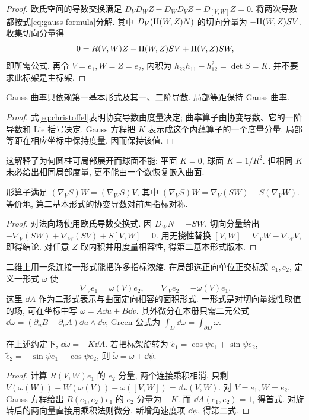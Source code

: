 \begin{proof}
欧氏空间的导数交换满足 $D_VD_WZ-D_WD_VZ-D_{[V,W]}Z=0$. 将两次导数都按式\eqref{eq:gauss-formula}分解. 其中 $D_V(\mathrm{II}(W,Z)N)$ 的切向分量为 $-\mathrm{II}(W,Z)SV$. 收集切向分量得
\[
 0=R(V,W)Z-\mathrm{II}(W,Z)SV+\mathrm{II}(V,Z)SW,
\]
即所需公式. 再令 $V=e_1,W=Z=e_2$, 内积为 $h_{22}h_{11}-h_{12}^2=\det S=K$. 并不要求此标架是主标架.
\end{proof}
\begin{corollary}\label{cor:egregium}
Gauss 曲率只依赖第一基本形式及其一、二阶导数. 局部等距保持 Gauss 曲率.
\end{corollary}
\begin{proof}
式\eqref{eq:christoffel}表明协变导数由度量决定; 曲率算子由协变导数、它的一阶导数和 Lie 括号决定. Gauss 方程把 $K$ 表示成这个内蕴算子的一个度量分量. 局部等距在相应坐标中保持度量, 因而保持该值.
\end{proof}
这解释了为何圆柱可局部展开而球面不能: 平面 $K=0$, 球面 $K=1/R^2$. 但相同 $K$ 未必给出相同局部度量, 更不能由一个数恢复嵌入曲面.
\begin{proposition}[Codazzi 方程]\label{prop:codazzi}
形算子满足 $(\nabla_VS)W=(\nabla_WS)V$, 其中 $(\nabla_VS)W=\nabla_V(SW)-S(\nabla_VW)$. 等价地, 第二基本形式的协变导数对前两指标对称.
\end{proposition}
\begin{proof}
对法向场使用欧氏导数交换式. 因 $D_WN=-SW$, 切向分量给出 $-\nabla_V(SW)+\nabla_W(SV)+S[V,W]=0$. 用无挠性替换 $[V,W]=\nabla_VW-\nabla_WV$, 即得结论. 对任意 $Z$ 取内积并用度量相容性, 得第二基本形式版本.
\end{proof}
二维上用一条连接一形式能把许多指标浓缩. 在局部选正向单位正交标架 $e_1,e_2$, 定义一形式 $\omega$ 使
\[
 \nabla_Ve_1=\omega(V)e_2,\qquad \nabla_Ve_2=-\omega(V)e_1.
\]
这里 $\dd A$ 作为二形式表示与曲面定向相容的面积形式. 一形式是对切向量线性取值的场, 可在坐标中写 $\omega=A\dd u+B\dd v$. 其外微分在本册只需二元公式 $\dd\omega=(\partial_uB-\partial_vA)\dd u\wedge\dd v$; Green 公式为 $\int_D\dd\omega=\int_{\partial D}\omega$.
\begin{proposition}\label{prop:connection-curvature}
在上述约定下, $\dd\omega=-K\dd A$. 若把标架旋转为 $\widetilde e_1=\cos\psi e_1+\sin\psi e_2$, $\widetilde e_2=-\sin\psi e_1+\cos\psi e_2$, 则 $\widetilde\omega=\omega+\dd\psi$.
\end{proposition}
\begin{proof}
计算 $R(V,W)e_1$ 的 $e_2$ 分量, 两个连接乘积相消, 只剩 $V(\omega(W))-W(\omega(V))-\omega([V,W])=\dd\omega(V,W)$. 对 $V=e_1,W=e_2$, Gauss 方程给出 $R(e_1,e_2)e_1$ 的 $e_2$ 分量为 $-K$. 而 $\dd A(e_1,e_2)=1$, 得首式. 对旋转后的两向量直接用乘积法则微分, 新增角速度项 $\dd\psi$, 得第二式.
\end{proof}
